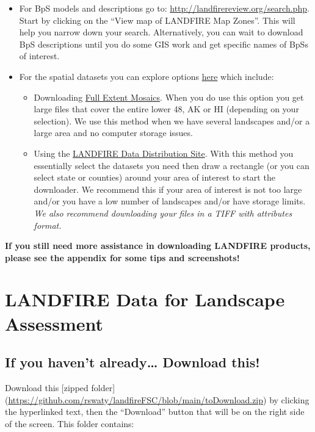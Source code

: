 \documentclass[
]{book}
\providecommand{\tightlist}{%
  \setlength{\itemsep}{0pt}\setlength{\parskip}{0pt}}
\begin{document}
\begin{itemize}
\tightlist
\item
  For BpS models and descriptions go to: \url{http://landfirereview.org/search.php}. Start by clicking on the ``View map of LANDFIRE Map Zones''. This will help you narrow down your search. Alternatively, you can wait to download BpS descriptions until you do some GIS work and get specific names of BpSs of interest.
\item
  For the spatial datasets you can explore options \href{https://www.landfire.gov/getdata.php}{here} which include:

  \begin{itemize}
  \tightlist
  \item
    Downloading \href{https://www.landfire.gov/version_comparison.php}{Full Extent Mosaics}. When you do use this option you get large files that cover the entire lower 48, AK or HI (depending on your selection). We use this method when we have several landscapes and/or a large area and no computer storage issues.
  \item
    Using the \href{https://www.landfire.gov/viewer/}{LANDFIRE Data Distribution Site}. With this method you essentially select the datasets you need then draw a rectangle (or you can select state or counties) around your area of interest to start the downloader. We recommend this if your area of interest is not too large and/or you have a low number of landscapes and/or have storage limits.
    \emph{We also recommend downloading your files in a TIFF with attributes format.}
  \end{itemize}
\end{itemize}

\textbf{If you still need more assistance in downloading LANDFIRE products, please see the appendix for some tips and screenshots!}

\hypertarget{gis}{%
\chapter{LANDFIRE Data for Landscape Assessment}\label{gis}}

\hypertarget{if-you-havent-already-download-this}{%
\section{If you haven't already\ldots{} Download this!}\label{if-you-havent-already-download-this}}

Download this {[}zipped folder{]} (\url{https://github.com/rswaty/landfireFSC/blob/main/toDownload.zip}) by clicking the hyperlinked text, then the ``Download'' button that will be on the right side of the screen. This folder contains:
\end{document}
